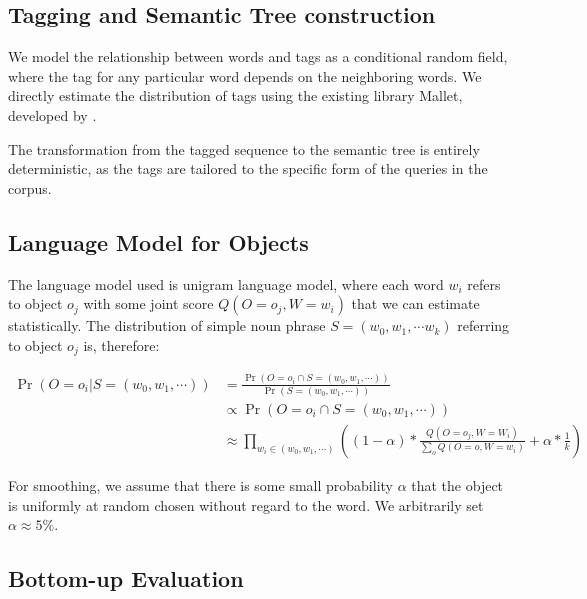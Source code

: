 \documentclass[letterpaper,10pt]{article}
\begin{document}

\subsection{Tagging and Semantic Tree construction}

We model the relationship between words and tags as a conditional random field, where the tag for any particular word depends on the neighboring words. We directly estimate the distribution of tags using the existing library Mallet, developed by \citet{McCallumMALLET}.

The transformation from the tagged sequence to the semantic tree is entirely deterministic, as the tags are tailored to the specific form of the queries in the corpus.

\subsection{Language Model for Objects}

The language model used is unigram language model, where each word $w_i$ refers to object $o_j$ with some joint score $Q(O = o_j, W = w_i)$ that we can estimate statistically. 
The distribution of simple noun phrase $S = (w_0, w_1, \cdots w_k)$ referring to object $o_j$ is, therefore:

\begin{align*}
	\Pr(O = o_i | S = (w_0, w_1, \cdots)) & = \frac{\Pr(O = o_i \cap S = (w_0, w_1, \cdots ))}{\Pr(S = (w_0, w_1, \cdots))}
\\ & \propto \Pr(O = o_i \cap S = (w_0, w_1, \cdots))
\\ & \approx \prod_{w_i \in (w_0, w_1, \cdots)} \left( (1 - \alpha) * \frac{Q(O = o_j, W = W_i)}{\sum_{o} Q(O = o, W = w_i)} + \alpha * \frac{1}{k} \right)
\end{align*}

For smoothing, we assume that there is some small probability $\alpha$ that the object is uniformly at random chosen without regard to the word. We arbitrarily set $\alpha \approx 5\%$.

\subsection{Bottom-up Evaluation}
\end{document}
